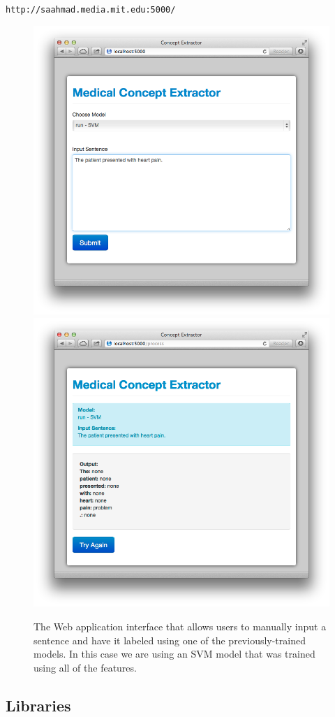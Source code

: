 \documentclass[preprint]{style}
\begin{document}
{\tt http://saahmad.media.mit.edu:5000/ }

\begin{figure}[t]
\begin{center}
	\includegraphics[width=0.75\columnwidth]{figures/web-interface-1.png}
	\includegraphics[width=0.75\columnwidth]{figures/web-interface-2.png}
\end{center}
\caption{The Web application interface that allows users to manually input a sentence and have it labeled using one of the previously-trained models. In this case we are using an SVM model that was trained using all of the features.}
\label{fig:web_interface}
\end{figure}


\subsection{Libraries}
\end{document}
